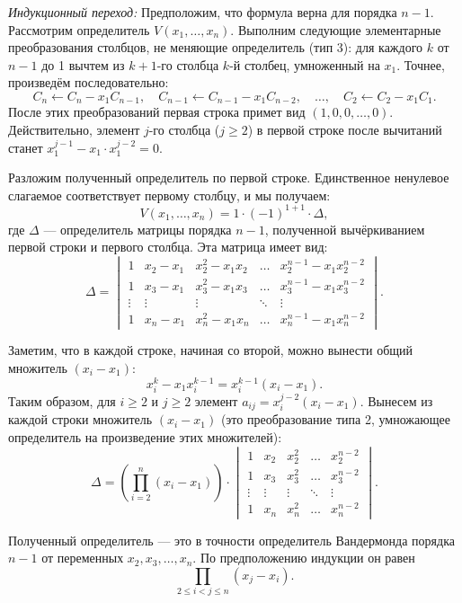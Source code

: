 \documentclass[a4paper,12pt]{article}
\theoremstyle{definition}
\theoremstyle{plain}
\theoremstyle{remark}
\begin{document}
	\textit{Индукционный переход:} Предположим, что формула верна для порядка \(n-1\). Рассмотрим определитель \(V(x_1, \dots, x_n)\). Выполним следующие элементарные преобразования столбцов, не меняющие определитель (тип 3): для каждого \(k\) от \(n-1\) до 1 вычтем из \(k+1\)-го столбца \(k\)-й столбец, умноженный на \(x_1\). Точнее, произведём последовательно:
	\[
	C_{n} \leftarrow C_{n} - x_1 C_{n-1},\quad C_{n-1} \leftarrow C_{n-1} - x_1 C_{n-2},\quad \dots,\quad C_2 \leftarrow C_2 - x_1 C_1.
	\]
	После этих преобразований первая строка примет вид \((1, 0, 0, \dots, 0)\). Действительно, элемент \(j\)-го столбца (\(j \geq 2\)) в первой строке после вычитаний станет \(x_1^{j-1} - x_1 \cdot x_1^{j-2} = 0\).
	
	Разложим полученный определитель по первой строке. Единственное ненулевое слагаемое соответствует первому столбцу, и мы получаем:
	\[
	V(x_1, \dots, x_n) = 1 \cdot (-1)^{1+1} \cdot \Delta,
	\]
	где \(\Delta\) — определитель матрицы порядка \(n-1\), полученной вычёркиванием первой строки и первого столбца. Эта матрица имеет вид:
	\[
	\Delta = 
	\begin{vmatrix}
		1 & x_2 - x_1 & x_2^2 - x_1 x_2 & \dots & x_2^{n-1} - x_1 x_2^{n-2} \\
		1 & x_3 - x_1 & x_3^2 - x_1 x_3 & \dots & x_3^{n-1} - x_1 x_3^{n-2} \\
		\vdots & \vdots & \vdots & \ddots & \vdots \\
		1 & x_n - x_1 & x_n^2 - x_1 x_n & \dots & x_n^{n-1} - x_1 x_n^{n-2}
	\end{vmatrix}.
	\]
	
	Заметим, что в каждой строке, начиная со второй, можно вынести общий множитель \((x_i - x_1)\):
	\[
	x_i^{k} - x_1 x_i^{k-1} = x_i^{k-1}(x_i - x_1).
	\]
	Таким образом, для \(i \geq 2\) и \(j \geq 2\) элемент \(a_{ij} = x_i^{j-2}(x_i - x_1)\). Вынесем из каждой строки множитель \((x_i - x_1)\) (это преобразование типа 2, умножающее определитель на произведение этих множителей):
	\[
	\Delta = \left( \prod_{i=2}^n (x_i - x_1) \right) \cdot 
	\begin{vmatrix}
		1 & x_2 & x_2^2 & \dots & x_2^{n-2} \\
		1 & x_3 & x_3^2 & \dots & x_3^{n-2} \\
		\vdots & \vdots & \vdots & \ddots & \vdots \\
		1 & x_n & x_n^2 & \dots & x_n^{n-2}
	\end{vmatrix}.
	\]
	
	Полученный определитель — это в точности определитель Вандермонда порядка \(n-1\) от переменных \(x_2, x_3, \dots, x_n\). По предположению индукции он равен
	\[
	\prod_{2 \leq i < j \leq n} (x_j - x_i).
	\]
	
\end{document}
